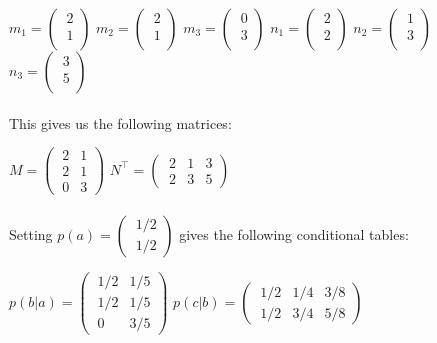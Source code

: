 \documentclass[11pt,a4paper,oneside]{report}
\begin{document}
$m_1 =   
 \begin{pmatrix}
   \ 2  \\[0.4em]
   \ 1  \\
 \end{pmatrix} 
$  
$m_2 =   
 \begin{pmatrix}
   \ 2  \\[0.4em]
   \ 1  \\
 \end{pmatrix} 
$  
$m_3 =   
 \begin{pmatrix}
   \ 0  \\[0.4em]
   \ 3  \\
 \end{pmatrix} 
$  
$n_1 =   
 \begin{pmatrix}
   \ 2  \\[0.4em]
   \ 2  \\
 \end{pmatrix} 
$  
$n_2 =   
 \begin{pmatrix}
   \ 1  \\[0.4em]
   \ 3  \\
 \end{pmatrix} 
$  
$n_3 =   
 \begin{pmatrix}
   \ 3  \\[0.4em]
   \ 5  \\
 \end{pmatrix}
 $\\\\
This gives us the following matrices:

$ M = 
 \begin{pmatrix}
   \ 2 & 1 \\[0.4em]
   \ 2 & 1 \\[0.4em]
   \ 0 & 3
 \end{pmatrix}
$
$ N^\top = 
 \begin{pmatrix}
   \ 2 & 1 & 3 \\[0.4em]
   \ 2 & 3 & 5
 \end{pmatrix}
$\\\\
Setting $p(a) = 
 \begin{pmatrix}
   \ 1/2 \\[0.4em]
   \ 1/2
 \end{pmatrix}
$ gives the following conditional tables:

$ p(b|a) = \begin{pmatrix}
   \ 1/2 & 1/5 \\[0.4em]
   \ 1/2 & 1/5 \\[0.4em]
   \ 0 & 3/5
 \end{pmatrix} 
$
$ p(c|b) = \begin{pmatrix}
   \ 1/2 & 1/4 & 3/8 \\[0.4em]
   \ 1/2 & 3/4 & 5/8
 \end{pmatrix} 
$
\end{document}
